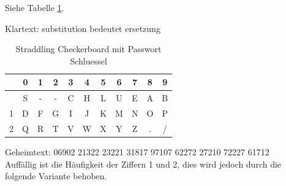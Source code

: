 \begin{refsegment}
\begin{itemize}
   Siehe Tabelle \ref{Straddling-Checkerboard-table-reference}.

   Klartext: substitution bedeutet ersetzung  %

   \begin{table}[ht]
   \begin{center}
   \begin{tabular}{|c|cccccccccc|}
   \hline
	  & 0 & 1 & 2 & 3 & 4 & 5 & 6 & 7 & 8 & 9\\
   \hline
	  & S & - & - & C & H & L & U & E & A & B\\
	1 & D & F & G & I & J & K & M & N & O & P\\
	2 & Q & R & T & V & W & X & Y & Z & . & /\\
   \hline
   \end{tabular}
   \caption{Straddling Checkerboard mit Passwort \glqq Schluessel\grqq}
   \label{Straddling-Checkerboard-table-reference}
   \end{center}
   \end{table}

   Geheimtext: 06902 21322 23221 31817 97107 62272 27210 72227 61712\\

   Auffällig ist die Häufigkeit der Ziffern 1 und 2,
   dies wird jedoch durch die folgende Variante behoben.\\



\end{itemize}
\end{refsegment}
